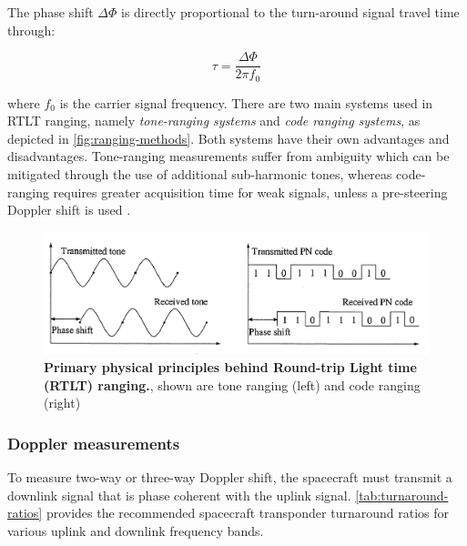 The phase shift $\Delta\Phi$ is directly proportional to the
turn-around signal travel time through:

\begin{equation}
    \tau = \frac{\Delta\Phi}{2\pi{}f_0}
\end{equation}

where $f_0$ is the carrier signal frequency. There are two main systems used in
RTLT ranging, namely \textit{tone-ranging systems} and \textit{code ranging
systems}, as depicted in \autoref{fig:ranging-methods}. Both systems have their
own advantages and disadvantages. Tone-ranging measurements suffer from
ambiguity which can be mitigated through the use of additional sub-harmonic
tones, whereas code-ranging requires greater acquisition time for weak signals,
unless a pre-steering Doppler shift is used \cite[p.~197]{Montenbruck2000}.

\begin{figure}
    \centering
    \includegraphics[width=1.0\linewidth]{graphics/ranging-method.PNG}
    \caption{
        \textbf{Primary physical principles behind Round-trip Light time (RTLT)
        ranging.}, shown are tone ranging (left) and code ranging (right)
        \cite[p.~196]{Montenbruck2000}
    }
    \label{fig:ranging-methods}
\end{figure}


\subsubsection{Doppler measurements}

To measure two-way or three-way Doppler shift, the spacecraft must transmit a
downlink signal that is phase coherent with the uplink signal.
\autoref{tab:turnaround-ratios} provides the recommended spacecraft transponder
turnaround ratios for various uplink and downlink frequency bands.

